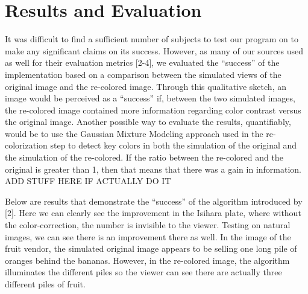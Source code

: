 \documentclass[10pt,twocolumn,letterpaper]{article}
\begin{document}
\section{Results and Evaluation}

It was difficult to find a sufficient number of subjects to test our program on to make any significant claims on its success. However, as many of our sources used as well for their evaluation metrics [2-4], we evaluated the “success” of the implementation based on a comparison between the simulated views of the original image and the re-colored image. Through this qualitative sketch, an image would be perceived as a “success” if, between the two simulated images, the re-colored image contained more information regarding color contrast versus the original image. Another possible way to evaluate the results, quantifiably, would be to use the Gaussian Mixture Modeling approach used in the re-colorization step to detect key colors in both the simulation of the original and the simulation of the re-colored. If the ratio between the re-colored and the original is greater than 1, then that means that there was a gain in information.  ADD STUFF HERE IF ACTUALLY DO IT

Below are results that demonstrate the “success” of the algorithm introduced by [2]. Here we can clearly see the improvement in the Isihara plate, where without the color-correction, the number is invisible to the viewer. Testing on natural images, we can see there is an improvement there as well. In the image of the fruit vendor, the simulated original image appears to be selling one long pile of oranges behind the bananas. However, in the re-colored image, the algorithm illuminates the different piles so the viewer can see there are actually three different piles of fruit. 
\end{document}
